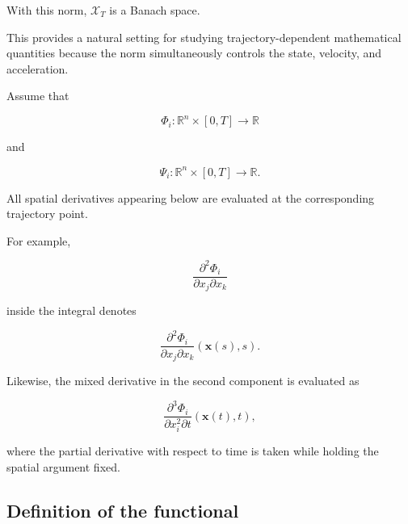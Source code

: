 \documentclass[12pt]{article}
\numberwithin{equation}{section}
\newcommand{\R}{\mathbb{R}}
\theoremstyle{definition}
\theoremstyle{remark}
\begin{document}
With this norm, \(\mathcal{X}_T\) is a
Banach space.

This provides a natural setting for studying
trajectory-dependent mathematical quantities
because the norm simultaneously controls
the state, velocity, and acceleration.

Assume that

\[
\Phi_i:\R^n\times[0,T]\to\R
\]

and

\[
\Psi_i:\R^n\times[0,T]\to\R.
\]

All spatial derivatives appearing below are
evaluated at the corresponding trajectory
point.

For example,

\[
\frac{\partial^2\Phi_i}
{\partial x_j\partial x_k}
\]

inside the integral denotes

\[
\frac{\partial^2\Phi_i}
{\partial x_j\partial x_k}
(\mathbf{x}(s),s).
\]

Likewise, the mixed derivative in the
second component is evaluated as

\[
\frac{\partial^3\Phi_i}
{\partial x_i^2\partial t}
(\mathbf{x}(t),t),
\]

where the partial derivative with respect
to time is taken while holding the spatial
argument fixed.

\subsection{Definition of the functional}
\end{document}
